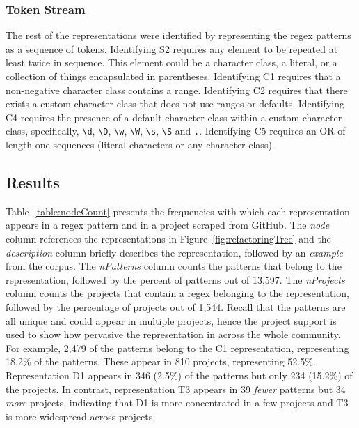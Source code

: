 \subsubsection{Token Stream }
The rest of the representations were identified by representing the regex patterns as a sequence of tokens.
Identifying S2 requires any element to be repeated at least twice in sequence. This element could be a character class, a literal, or a collection of things encapsulated in parentheses.
Identifying C1 requires that a non-negative character class contains a range.  Identifying C2 requires that there exists a custom character class that does not use ranges or defaults. Identifying C4 requires the presence of a default character class within a custom character class, specifically, \verb!\d!, \verb!\D!, \verb!\w!, \verb!\W!, \verb!\s!, \verb!\S! and \verb!.!.  Identifying C5 requires an OR of length-one sequences (literal characters or any character class).


\subsection{Results}
Table~\ref{table:nodeCount} presents the frequencies with which each representation appears in a regex pattern and in a project scraped from GitHub. The \emph{node} column references the representations in Figure~\ref{fig:refactoringTree} and the \emph{description} column briefly describes the representation, followed by an \emph{example} from the corpus. The \emph{nPatterns} column counts the patterns that belong to the representation, followed by the percent of patterns out of 13,597.
The \emph{nProjects} column counts the projects that contain a regex belonging to the representation,
followed by the percentage of projects out of 1,544.
Recall that the patterns are all unique and could appear in multiple projects, hence the project support is used to show how pervasive the representation in across the whole community.
For example, 2,479 of the patterns belong to the C1 representation, representing 18.2\% of the patterns. These appear in 810 projects, representing 52.5\%.
 Representation D1 appears in 346 (2.5\%) of the patterns but only 234 (15.2\%) of the projects. In contrast, representation T3 appears in 39 \emph{fewer} patterns but 34 \emph{more} projects, indicating that D1 is more concentrated in a few projects and T3 is more widespread across projects.


